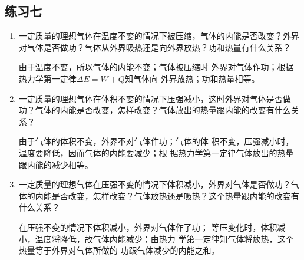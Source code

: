 \subsection{练习七}
\begin{enumerate}
	\item 一定质量的理想气体在温度不变的情况下被压缩，气体的内能是否改变？外界对气体是否做功？气体从外界吸热还是向外界放热？功和热量有什么关系？

    \begin{solution}
        由于温度不变，所以气体的内能不变；气体被压缩时
外界对气体作功；根据热力学第一定律$\Delta E=W+Q$知气体向
外界放热；功和热量相等。
    \end{solution}
\item 一定质量的理想气体在体积不变的情况下压强减小，这时外界对气体是否做功？气体的内能是否改变，怎样改变？气体放出的热量跟内能的改变有什么关系？

\begin{solution}
    由于气体的体积不变，外界不对气体作功；气体的体
积不变，压强减小时，温度要降低，因而气体的内能要减少；根
据热力学第一定律气体放出的热量跟内能的减少相等。
\end{solution}
\item 一定质量的理想气体在压强不变的情况下体积减小，外界对气体是否做功？气体的内能是否改变，怎样改变？气体放热还是吸热？这个热量跟内能的改变有什么关系？

\begin{solution}
    在压强不变的情况下体积减小，外界对气体作了功；
等压变化时，体积减小，温度将降低，故气体内能减少；由热力
学第一定律知气体将放热，这个热量等于外界对气体所做的
功跟气体减少的内能之和。
\end{solution}
\end{enumerate}

